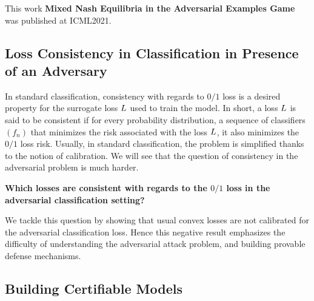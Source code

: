 This work \textbf{Mixed Nash Equilibria in the Adversarial Examples Game} was published at ICML2021.



\subsection{Loss Consistency in Classification in Presence of an Adversary}
In standard classification, consistency with regards to $0/1$ loss is a desired property for the surrogate loss $L$ used to train the model. In short, a loss $L$ is said to be consistent if for every probability distribution, a sequence of classifiers $(f_n)$ that minimizes the risk associated with the loss $L$, it also minimizes the $0/1$ loss risk. Usually, in standard classification, the problem is simplified thanks to the notion of calibration. We will see that the question of consistency in the adversarial problem is much harder. 
\medskip
\begin{tcolorbox}[title=Question 2]
\textbf{Which losses are consistent with regards to the $0/1$ loss in the adversarial classification setting?}
\end{tcolorbox}
\medskip
We tackle this question by showing that usual convex losses are not calibrated for the adversarial classification loss. Hence this negative result emphasizes the difficulty of understanding the adversarial attack problem, and building provable defense mechanisms. 
\subsection{Building Certifiable Models}

